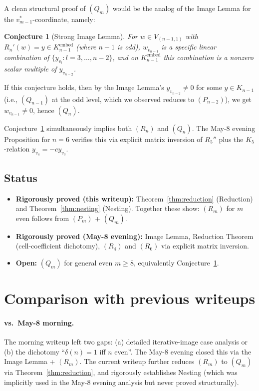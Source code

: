 \documentclass[11pt]{article}
\newtheorem{conjecture}[theorem]{Conjecture}
\theoremstyle{definition}
\begin{document}
A clean structural proof of $(Q_m)$ would be the analog of the
Image Lemma for the $v_{m-1}^*$-coordinate, namely:

\begin{conjecture}[Strong Image Lemma]\label{conj:strong-image}
For $w \in V_{(n-1,1)}$ with $R_n'(w) = y \in K_{n-1}^{\mathrm{embed}}$
(where $n-1$ is odd), $w_{v_{n-1}}$ is a specific linear
combination of $\{y_{v_l} : l = 3, \ldots, n-2\}$, and on
$K_{n-1}^{\mathrm{embed}}$ this combination is a nonzero scalar
multiple of $y_{v_{n-2}}$.
\end{conjecture}

If this conjecture holds, then by the Image Lemma's
$y_{v_{n-2}} \neq 0$ for some $y \in K_{n-1}$ (i.e., $(Q_{n-1})$ at
the odd level, which we observed reduces to $(P_{n-2})$), we get
$w_{v_{n-1}} \neq 0$, hence $(Q_n)$.

Conjecture~\ref{conj:strong-image} simultaneously implies both
$(R_n)$ and $(Q_n)$. The May-8 evening Proposition for $n=6$
verifies this via explicit matrix inversion of $R_5''$ plus the
$K_5$-relation $y_{v_4} = -c y_{v_3}$.

\subsection{Status}

\begin{itemize}[topsep=0.3em,itemsep=0.2em,leftmargin=2em]
\item \textbf{Rigorously proved (this writeup):}
  Theorem~\ref{thm:reduction} (Reduction) and Theorem~\ref{thm:nesting}
  (Nesting). Together these show: $(R_m)$ for $m$ even follows
  from $(P_m)$ + $(Q_m)$.
\item \textbf{Rigorously proved (May-8 evening):} Image Lemma,
  Reduction Theorem (cell-coefficient dichotomy), $(R_4)$ and $(R_6)$
  via explicit matrix inversion.
\item \textbf{Open:} $(Q_m)$ for general even $m \ge 8$, equivalently
  Conjecture~\ref{conj:strong-image}.
\end{itemize}

\section{Comparison with previous writeups}\label{sec:compare}

\paragraph{vs.\ May-8 morning.}
The morning writeup left two gaps: (a) detailed iterative-image
case analysis or (b) the dichotomy
``$\delta(n) = 1$ iff $n$ even''. The May-8 evening closed this via
the Image Lemma + $(R_m)$. The current writeup further reduces
$(R_m)$ to $(Q_m)$ via Theorem~\ref{thm:reduction}, and rigorously
establishes Nesting (which was implicitly used in the May-8 evening
analysis but never proved structurally).
\end{document}
